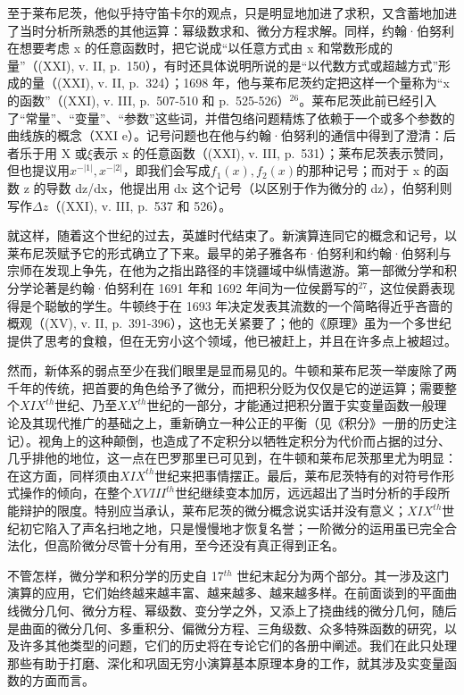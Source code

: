 至于莱布尼茨，他似乎持守笛卡尔的观点，只是明显地加进了求积，又含蓄地加进了当时分析所熟悉的其他运算：幂级数求和、微分方程求解。同样，约翰·伯努利在想要考虑 x 的任意函数时，把它说成“以任意方式由 x 和常数形成的量”（(XXI), v. II, p.~150），有时还具体说明所说的是“以代数方式或超越方式”形成的量（(XXI), v. II, p.~324）；1698 年，他与莱布尼茨约定把这样一个量称为“x 的函数”（(XXI), v. III, p.~507-510 和 p.~525-526）\(^{26}\)。莱布尼茨此前已经引入了“常量”、“变量”、“参数”这些词，并借包络问题精炼了依赖于一个或多个参数的曲线族的概念（XXI e）。记号问题也在他与约翰·伯努利的通信中得到了澄清：后者乐于用 X 或\(\xi\)表示 x 的任意函数（(XXI), v. III, p.~531）；莱布尼茨表示赞同，但也提议用\(x^{-|1|}, x^{-|2|}\)，即我们会写成\(f_{1}(x), f_{2}(x)\)的那种记号；而对于 x 的函数 z 的导数 dz/dx，他提出用 dx 这个记号（以区别于作为微分的 dz），伯努利则写作\(\Delta z\)（(XXI), v. III, p.~537 和 526）。

就这样，随着这个世纪的过去，英雄时代结束了。新演算连同它的概念和记号，以莱布尼茨赋予它的形式确立了下来。最早的弟子雅各布·伯努利和约翰·伯努利与宗师在发现上争先，在他为之指出路径的丰饶疆域中纵情遨游。第一部微分学和积分学论著是约翰·伯努利在 1691 年和 1692 年间为一位侯爵写的\(^{27}\)，这位侯爵表现得是个聪敏的学生。牛顿终于在 1693 年决定发表其流数的一个简略得近乎吝啬的概观（(XV), v. II, p.~391-396），这也无关紧要了；他的《原理》虽为一个多世纪提供了思考的食粮，但在无穷小这个领域，他已被赶上，并且在许多点上被超过。

然而，新体系的弱点至少在我们眼里是显而易见的。牛顿和莱布尼茨一举废除了两千年的传统，把首要的角色给予了微分，而把积分贬为仅仅是它的逆运算；需要整个\(XIX^{th}\)世纪、乃至\(XX^{th}\)世纪的一部分，才能通过把积分置于实变量函数一般理论及其现代推广的基础之上，重新确立一种公正的平衡（见《积分》一册的历史注记）。视角上的这种颠倒，也造成了不定积分以牺牲定积分为代价而占据的过分、几乎排他的地位，这一点在巴罗那里已可见到，在牛顿和莱布尼茨那里尤为明显：在这方面，同样须由\(XIX^{th}\)世纪来把事情摆正。最后，莱布尼茨特有的对符号作形式操作的倾向，在整个\(XVIII^{th}\)世纪继续变本加厉，远远超出了当时分析的手段所能辩护的限度。特别应当承认，莱布尼茨的微分概念说实话并没有意义；\(XIX^{th}\)世纪初它陷入了声名扫地之地，只是慢慢地才恢复名誉；一阶微分的运用虽已完全合法化，但高阶微分尽管十分有用，至今还没有真正得到正名。

不管怎样，微分学和积分学的历史自 17\(^{th}\) 世纪末起分为两个部分。其一涉及这门演算的应用，它们始终越来越丰富、越来越多、越来越多样。在前面谈到的平面曲线微分几何、微分方程、幂级数、变分学之外，又添上了挠曲线的微分几何，随后是曲面的微分几何、多重积分、偏微分方程、三角级数、众多特殊函数的研究，以及许多其他类型的问题，它们的历史将在专论它们的各册中阐述。我们在此只处理那些有助于打磨、深化和巩固无穷小演算基本原理本身的工作，就其涉及实变量函数的方面而言。

